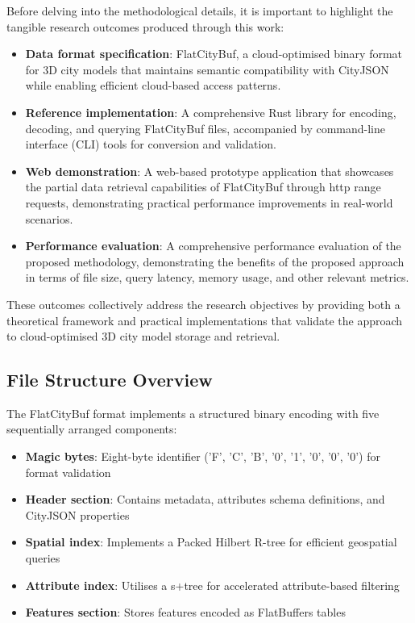 Before delving into the methodological details, it is important to highlight the tangible research outcomes produced through this work:

\begin{itemize}
  \item \textbf{Data format specification}: FlatCityBuf, a cloud-optimised binary format for 3D city models that maintains semantic compatibility with CityJSON while enabling efficient cloud-based access patterns.

  \item \textbf{Reference implementation}: A comprehensive Rust library for encoding, decoding, and querying FlatCityBuf files, accompanied by command-line interface (CLI) tools for conversion and validation.

  \item \textbf{Web demonstration}: A web-based prototype application that showcases the partial data retrieval capabilities of FlatCityBuf through \ac{http} range requests, demonstrating practical performance improvements in real-world scenarios.

  \item \textbf{Performance evaluation}: A comprehensive performance evaluation of the proposed methodology, demonstrating the benefits of the proposed approach in terms of file size, query latency, memory usage, and other relevant metrics.
\end{itemize}

These outcomes collectively address the research objectives by providing both a theoretical framework and practical implementations that validate the approach to cloud-optimised 3D city model storage and retrieval.

\subsection{File Structure Overview}
\label{methodology:overview:file_structure}

The FlatCityBuf format implements a structured binary encoding with five sequentially arranged components:

\begin{itemize}
  \item \textbf{Magic bytes}: Eight-byte identifier ('F', 'C', 'B', '0', '1', '0', '0', '0') for format validation
  \item \textbf{Header section}: Contains metadata, attributes schema definitions, and CityJSON properties
  \item \textbf{Spatial index}: Implements a Packed Hilbert R-tree \citep{Kamel_Faloutsos_1993} for efficient geospatial queries
  \item \textbf{Attribute index}: Utilises a \ac{s+tree} for accelerated attribute-based filtering
  \item \textbf{Features section}: Stores features encoded as FlatBuffers tables
\end{itemize}

